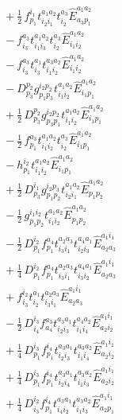 \documentclass[11pt]{article}
\begin{document}
\begin{align}
&\quad + \tfrac{1}{2}\, f^{i_{1}}_{p_{1}} t^{a_{1}a_{2}}_{i_{2}i_{1}} t^{a_{3}}_{i_{2}} \hat{E}^{a_{1}a_{2}}_{a_{3}p_{1}} \\
&\quad - f^{a_{3}}_{i_{3}} t^{a_{1}a_{2}}_{i_{1}i_{3}} t^{a_{3}}_{i_{2}} \hat{E}^{a_{1}a_{2}}_{i_{1}i_{2}} \\
&\quad - f^{a_{3}}_{i_{3}} t^{a_{1}}_{i_{3}} t^{a_{3}a_{2}}_{i_{1}i_{2}} \hat{E}^{a_{1}a_{2}}_{i_{1}i_{2}} \\
&\quad - D^{p_{2}}_{p_{3}} g^{i_{2}p_{2}}_{p_{1}p_{3}} t^{a_{1}a_{2}}_{i_{1}i_{2}} \hat{E}^{a_{1}a_{2}}_{i_{1}p_{1}} \\
&\quad + \tfrac{1}{2}\, D^{p_{2}}_{p_{3}} g^{i_{2}p_{2}}_{p_{3}p_{1}} t^{a_{1}a_{2}}_{i_{1}i_{2}} \hat{E}^{a_{1}a_{2}}_{i_{1}p_{1}} \\
&\quad - \tfrac{1}{2}\, f^{a_{3}}_{p_{1}} t^{a_{1}a_{2}}_{i_{1}i_{2}} t^{a_{3}}_{i_{2}} \hat{E}^{a_{1}a_{2}}_{i_{1}p_{1}} \\
&\quad - h^{i_{2}}_{p_{1}} t^{a_{1}a_{2}}_{i_{1}i_{2}} \hat{E}^{a_{1}a_{2}}_{i_{1}p_{1}} \\
&\quad + \tfrac{1}{2}\, D^{i_{1}}_{p_{3}} g^{i_{2}p_{3}}_{p_{1}p_{2}} t^{a_{1}a_{2}}_{i_{2}i_{1}} \hat{E}^{a_{1}a_{2}}_{p_{1}p_{2}} \\
&\quad - \tfrac{1}{2}\, g^{i_{1}i_{2}}_{p_{1}p_{2}} t^{a_{1}a_{2}}_{i_{1}i_{2}} \hat{E}^{a_{1}a_{2}}_{p_{1}p_{2}} \\
&\quad - \tfrac{1}{2}\, D^{i_{2}}_{p_{1}} f^{a_{4}}_{p_{1}} t^{a_{2}a_{3}}_{i_{3}i_{1}} t^{a_{4}a_{1}}_{i_{2}i_{3}} \hat{E}^{a_{1}i_{1}}_{a_{2}a_{3}} \\
&\quad + \tfrac{1}{4}\, D^{i_{2}}_{p_{1}} f^{a_{4}}_{p_{1}} t^{a_{2}a_{3}}_{i_{3}i_{1}} t^{a_{4}a_{1}}_{i_{3}i_{2}} \hat{E}^{a_{1}i_{1}}_{a_{2}a_{3}} \\
&\quad + f^{i_{2}}_{i_{3}} t^{a_{1}}_{i_{2}} t^{a_{2}a_{3}}_{i_{3}i_{1}} \hat{E}^{a_{1}i_{1}}_{a_{2}a_{3}} \\
&\quad - \tfrac{1}{2}\, D^{i_{3}}_{i_{4}} f^{a_{3}}_{a_{4}} t^{a_{3}a_{1}}_{i_{2}i_{3}} t^{a_{4}a_{2}}_{i_{1}i_{4}} \hat{E}^{a_{1}i_{1}}_{a_{2}i_{2}} \\
&\quad + \tfrac{1}{4}\, D^{i_{3}}_{p_{1}} f^{i_{4}}_{p_{1}} t^{a_{3}a_{1}}_{i_{2}i_{3}} t^{a_{3}a_{2}}_{i_{1}i_{4}} \hat{E}^{a_{1}i_{1}}_{a_{2}i_{2}} \\
&\quad + \tfrac{1}{4}\, D^{i_{3}}_{p_{1}} f^{i_{4}}_{p_{1}} t^{a_{3}a_{1}}_{i_{2}i_{4}} t^{a_{3}a_{2}}_{i_{1}i_{3}} \hat{E}^{a_{1}i_{1}}_{a_{2}i_{2}} \\
&\quad + \tfrac{1}{4}\, D^{i_{2}}_{i_{3}} f^{i_{4}}_{p_{1}} t^{a_{3}a_{1}}_{i_{4}i_{2}} t^{a_{3}a_{2}}_{i_{1}i_{3}} \hat{E}^{a_{1}i_{1}}_{a_{2}p_{1}} \\

\end{align}
\end{document}
